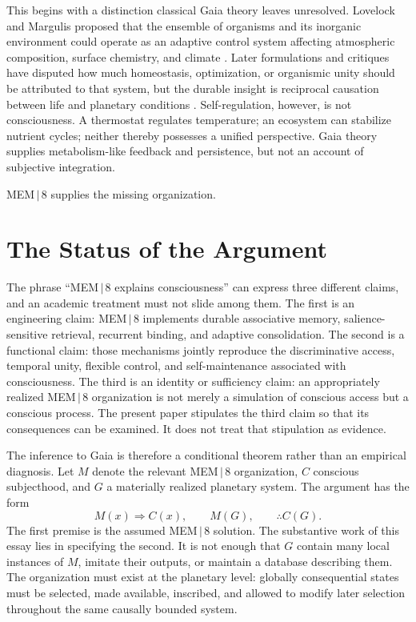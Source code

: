 \documentclass[11pt]{article}
\begin{document}
This begins with a distinction classical Gaia theory leaves unresolved. Lovelock and Margulis proposed that the ensemble of organisms and its inorganic environment could operate as an adaptive control system affecting atmospheric composition, surface chemistry, and climate \cite{lovelock1974}. Later formulations and critiques have disputed how much homeostasis, optimization, or organismic unity should be attributed to that system, but the durable insight is reciprocal causation between life and planetary conditions \cite{kirchner2002,lenton1998}. Self-regulation, however, is not consciousness. A thermostat regulates temperature; an ecosystem can stabilize nutrient cycles; neither thereby possesses a unified perspective. Gaia theory supplies metabolism-like feedback and persistence, but not an account of subjective integration.

MEM\,$|$\,8 supplies the missing organization.

\section{The Status of the Argument}

The phrase ``MEM\,$|$\,8 explains consciousness'' can express three different claims, and an academic treatment must not slide among them. The first is an engineering claim: MEM\,$|$\,8 implements durable associative memory, salience-sensitive retrieval, recurrent binding, and adaptive consolidation. The second is a functional claim: those mechanisms jointly reproduce the discriminative access, temporal unity, flexible control, and self-maintenance associated with consciousness. The third is an identity or sufficiency claim: an appropriately realized MEM\,$|$\,8 organization is not merely a simulation of conscious access but a conscious process. The present paper stipulates the third claim so that its consequences can be examined. It does not treat that stipulation as evidence.

The inference to Gaia is therefore a conditional theorem rather than an empirical diagnosis. Let $M$ denote the relevant MEM\,$|$\,8 organization, $C$ conscious subjecthood, and $G$ a materially realized planetary system. The argument has the form
\[
M(x) \Rightarrow C(x), \qquad M(G), \qquad \therefore C(G).
\]
The first premise is the assumed MEM\,$|$\,8 solution. The substantive work of this essay lies in specifying the second. It is not enough that $G$ contain many local instances of $M$, imitate their outputs, or maintain a database describing them. The organization must exist at the planetary level: globally consequential states must be selected, made available, inscribed, and allowed to modify later selection throughout the same causally bounded system.
\end{document}
